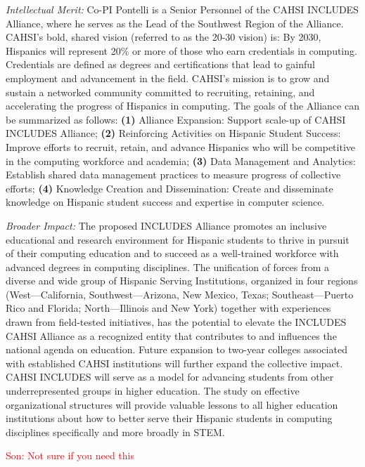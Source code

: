 \noindent \textit{Intellectual Merit:}
Co-PI Pontelli is a Senior Personnel of the CAHSI INCLUDES Alliance, where he serves as the Lead of the Southwest Region of the Alliance. CAHSI’s bold, shared vision (referred to as the 20-30 vision) is:  By 2030, Hispanics will represent 20\% or more of those who earn credentials in computing. Credentials are defined as degrees and certifications that lead to gainful employment and advancement in the field. CAHSI’s mission is to grow and sustain a networked community committed to recruiting, retaining, and accelerating the progress of Hispanics in computing. The goals of the Alliance can be summarized as follows: {\bf (1)}  Alliance Expansion:  Support scale-up of CAHSI INCLUDES Alliance; {\bf (2)}
 Reinforcing Activities on Hispanic Student Success:  Improve efforts to recruit, retain, and advance Hispanics who will be competitive in the computing workforce and academia; {\bf (3)} Data Management and Analytics: Establish shared data management practices to measure 
              progress of collective efforts;
              {\bf (4)}
Knowledge Creation and Dissemination: Create and disseminate knowledge on Hispanic 
              student success and expertise in computer science.  


\noindent \textit{Broader Impact:}
The proposed INCLUDES Alliance promotes an inclusive educational and research environment for Hispanic students to thrive in pursuit of their computing education and to succeed as a well-trained workforce with advanced degrees in computing disciplines. The unification of forces from a diverse and wide group of Hispanic Serving Institutions, organized in four regions (West---California, Southwest---Arizona, New Mexico, Texas; Southeast---Puerto Rico and Florida; North---Illinois and New York) together with experiences drawn from field-tested initiatives, has the potential to elevate the INCLUDES CAHSI Alliance as a recognized entity that contributes to and influences the national agenda on education. Future expansion to two-year colleges associated with established CAHSI institutions will further expand the collective impact.  CAHSI INCLUDES will serve as a model for advancing students from other underrepresented groups in higher education. The study on effective organizational structures will provide valuable lessons to all higher education institutions about how to better serve their Hispanic students in computing disciplines specifically and more broadly in STEM. 


\medskip
\textcolor{red}{Son:  Not sure if you need this}
